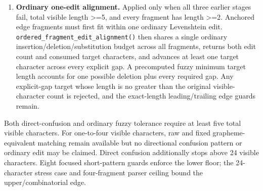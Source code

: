 \begin{enumerate}
  \begin{itemize}
  \tightlist
  \item
    total visible length 5-\/-7: maximum one confusion and cost \texttt{1.00};
  \item
    total visible length 8-\/-24: maximum two confusions and cost \texttt{1.40};
  \item
    direct confusion is disabled above \texttt{MAX\_\allowbreak{}VISUAL\_\allowbreak{}GAP\_\allowbreak{}CONFUSION\_\allowbreak{}VISIBLE\_\allowbreak{}CHARACTERS\ =\ 24};
  \item
    each intermediate pattern set is sorted deterministically and capped by \texttt{VISUAL\_\allowbreak{}GAP\_\allowbreak{}CONFUSION\_\allowbreak{}PATTERN\_\allowbreak{}LIMIT\ =\ 512};
  \item
    rewritten output is not rewritten again, so a single original glyph cannot acquire a transitive \texttt{I\ -\textgreater{}\ E\ -\textgreater{}\ G} interpretation;
  \item
    every explicit leading, internal, and trailing marker still requires a nonzero hidden span.
  \end{itemize}
\item
  \textbf{Ordinary one-edit alignment.} Applied only when all three earlier stages fail, total visible length \textgreater=5, and every fragment has length \textgreater=2. Anchored edge fragments must first fit within one ordinary Levenshtein edit. \texttt{ordered\_\allowbreak{}fragment\_\allowbreak{}edit\_\allowbreak{}alignment()} then shares a single ordinary insertion/deletion/substitution budget across all fragments, returns both edit count and consumed target characters, and advances at least one target character across every explicit gap. A precomputed fuzzy minimum target length accounts for one possible deletion plus every required gap. Any explicit-gap target whose length is no greater than the original visible-character count is rejected, and the exact-length leading/trailing edge guards remain.
\end{enumerate}

Both direct-confusion and ordinary fuzzy tolerance require at least five total visible characters. For one-to-four visible characters, raw and fixed grapheme-equivalent matching remain available but no directional confusion pattern or ordinary edit may be claimed. Direct confusion additionally stops above 24 visible characters. Eight focused short-pattern guards enforce the lower floor; the 24-character stress case and four-fragment parser ceiling bound the upper/combinatorial edge.


